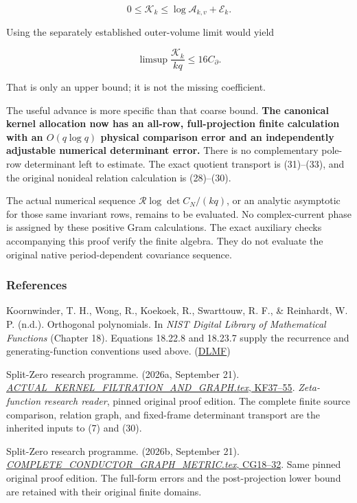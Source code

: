 \documentclass[11pt]{article}
\begin{document}
\[
\boxed{
0\le\mathcal K_k
\le\log\mathcal A_{k,v}+\mathcal E_k.
}
\tag{36}
\]

Using the separately established outer-volume limit would yield

\[
\limsup\frac{\mathcal K_k}{kq}\le16C_\partial.
\]

That is only an upper bound; it is not the missing coefficient.

The useful advance is more specific than that coarse bound. \textbf{The canonical kernel allocation now has an all-row, full-projection finite calculation with an \(O(q\log q)\) physical comparison error and an independently adjustable numerical determinant error.} There is no complementary pole-row determinant left to estimate. The exact quotient transport is (31)--(33), and the original nonideal relation calculation is (28)--(30).

The actual numerical sequence \(\mathcal R\log\det C_N/(kq)\), or an analytic asymptotic for those same invariant rows, remains to be evaluated. No complex-current phase is assigned by these positive Gram calculations. The exact auxiliary checks accompanying this proof verify the finite algebra. They do not evaluate the original native period-dependent covariance sequence.

\subsubsection{References}\label{references}

Koornwinder, T. H., Wong, R., Koekoek, R., Swarttouw, R. F., \& Reinhardt, W. P. (n.d.). Orthogonal polynomials. In \emph{NIST Digital Library of Mathematical Functions} (Chapter 18). Equations 18.22.8 and 18.23.7 supply the recurrence and generating-function conventions used above. (\href{https://dlmf.nist.gov/18}{DLMF})

Split-Zero research programme. (2026a, September 21). \href{https://github.com/KokunoYumeto/zeta-function-research-reader/blob/0fd693c844aad9117e30ec447c59864a28af10f3/workbenches/splitzero-tandem/continuations/20260921-native-spectral-real-pair/003/ACTUAL_KERNEL_FILTRATION_AND_GRAPH.tex\#L270}{\emph{ACTUAL\_KERNEL\_FILTRATION\_AND\_GRAPH.tex}, KF37--55}. \emph{Zeta-function research reader}, pinned original proof edition. The complete finite source comparison, relation graph, and fixed-frame determinant transport are the inherited inputs to (7) and (30).

Split-Zero research programme. (2026b, September 21). \href{https://github.com/KokunoYumeto/zeta-function-research-reader/blob/0fd693c844aad9117e30ec447c59864a28af10f3/workbenches/splitzero-tandem/continuations/20260921-native-spectral-real-pair/003/COMPLETE_CONDUCTOR_GRAPH_METRIC.tex\#L113}{\emph{COMPLETE\_CONDUCTOR\_GRAPH\_METRIC.tex}, CG18--32}. Same pinned original proof edition. The full-form errors and the post-projection lower bound are retained with their original finite domains.
\end{document}
